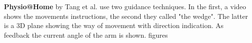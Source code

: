 \textbf{Physio@Home} by Tang et al. \cite{Tang2015} use two guidance techniques. In the first, a video shows the movements instructions, the second they called "the wedge". The latter is a 3D plane showing the way of movement with direction indication. As feedback the current angle of the arm is shown. \todo figures

